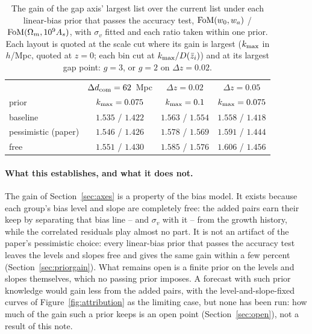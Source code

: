 \documentclass[11pt]{article}
\newcommand{\dcom}{$\Delta d_{\rm com} = 62$~Mpc}
\newcommand{\sv}{\sigma_v}
\begin{document}
\begin{table}[ht]
  \centering
  \small
  \setlength{\tabcolsep}{5pt}
  \begin{tabular}{lccc}
    \hline
    & \dcom{} & $\Delta z = 0.02$ & $\Delta z = 0.05$ \\
    prior & $k_{\rm max} = 0.075$ & $k_{\rm max} = 0.1$
      & $k_{\rm max} = 0.075$ \\
    \hline
    baseline & $1.535$ / $1.422$ & $1.563$ / $1.554$ & $1.558$ / $1.418$ \\
    pessimistic (paper) & $1.546$ / $1.426$ & $1.578$ / $1.569$ & $1.591$ / $1.444$ \\
    free & $1.551$ / $1.430$ & $1.585$ / $1.576$ & $1.606$ / $1.456$ \\
    \hline
  \end{tabular}
  \caption{The gain of the gap axis' largest list over the current
    list under each linear-bias prior that passes the accuracy
    test, ${\rm FoM}(w_0, w_a)$ / ${\rm FoM}(\Omega_m, 10^9 A_s)$,
    with $\sv$ fitted and each ratio taken within one prior.  Each
    layout is quoted at the scale cut where its gain is largest
    ($k_{\rm max}$ in $h$/Mpc, quoted at $z = 0$; each bin cut at
    $k_{\rm max}/D(\bar{z}_i)$) and at its largest gap point:
    $g = 3$, or $g = 2$ on $\Delta z = 0.02$.}
  \label{tab:priorgain}
\end{table}

\paragraph{What this establishes, and what it does not.}
The gain of Section~\ref{sec:axes} is a property of the bias model.
It exists because each group's bias level and slope are completely
free: the added pairs earn their keep by separating that bias line
-- and $\sv$ with it -- from the growth history, while the
correlated residuals play almost no part.  It is not an artifact of
the paper's pessimistic choice: every linear-bias prior that passes
the accuracy test leaves the levels and slopes free and gives the
same gain within a few percent (Section~\ref{sec:priorgain}).  What
remains open is a finite prior on the levels and slopes themselves,
which no passing prior imposes.  A forecast with such prior
knowledge would gain less from the added pairs, with the
level-and-slope-fixed curves of Figure~\ref{fig:attribution} as the
limiting case, but none has been run: how much of the gain such a
prior keeps is an open point (Section~\ref{sec:open}), not a result
of this note.
\end{document}
